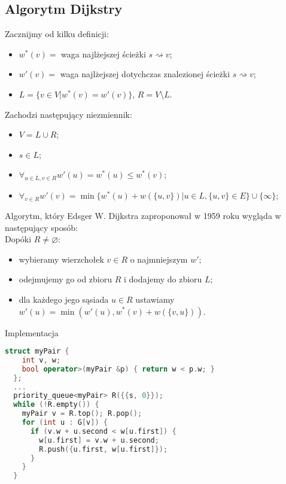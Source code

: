\documentclass[../main.tex]{subfiles}
\begin{document}
\subsection{Algorytm Dijkstry}

\begin{frame}{\subsecname}

Zacznijmy od kilku definicji:
\begin{itemize}
  \item $w^*(v) = $ waga najlżejszej ścieżki $s\rightsquigarrow v$;
  \item $w'(v) = $ waga najlżejszej dotychczas znalezionej ścieżki $s\rightsquigarrow v$;
  \item $L = \{ v \in V \big| w^*(v) = w'(v) \}$, $R = V \setminus L$.
\end{itemize}
\pause
Zachodzi następujący niezmiennik:
\begin{itemize}
  \item $V = L\cup R$;
  \item $s \in L$;
  \item $\forall_{u\in L, v\in R} w'(u) = w^*(u) \le w^*(v)$;
  \item $\forall_{v\in R} w'(v) = \min\{w^*(u) + w(\{u,v\}) \big| u\in L, \{u,v\}\in E\}\cup\{\infty\}$;
\end{itemize}

\end{frame}

\begin{frame}{\subsecname}

Algorytm, który Edsger W. Dijkstra zaproponował w 1959 roku wygląda w następujący sposób:\\
\pause
Dopóki $R \neq \varnothing$:
\begin{itemize}
  \pause\item wybieramy wierzchołek $v \in R$ o najmniejszym $w'$;
  \pause\item odejmujemy go od zbioru $R$ i dodajemy do zbioru $L$;
  \pause\item dla każdego jego sąsiada $u \in R$ ustawiamy $w'(u) = \min(w'(u), w^*(v) + w(\{v,u\}))$.
\end{itemize}

\end{frame}

\begin{frame}[fragile]{\subsecname}{Implementacja}

\begin{block}{}
\begin{lstlisting}[language = C++]
  struct myPair { 
    int v, w;
    bool operator>(myPair &p) { return w < p.w; }
  };
  ...
  priority_queue<myPair> R({{s, 0}});
  while (!R.empty()) {
    myPair v = R.top(); R.pop();
    for (int u : G[v]) {
      if (v.w + u.second < w[u.first]) {
        w[u.first] = v.w + u.second;
        R.push({u.first, w[u.first]});
      }
    }
  }
\end{lstlisting}
\end{block}

\end{frame}
\end{document}
